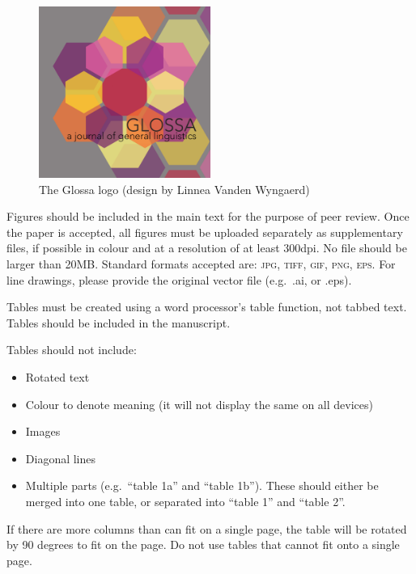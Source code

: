 \documentclass[]{glossa}
\begin{document}
\begin{figure}

{\centering \includegraphics[width=0.5\textwidth]{glossa} 

}

\caption{The Glossa logo (design by Linnea Vanden Wyngaerd)}\label{fig:fig-glossa}
\end{figure}

Figures should be included in the main text for the purpose of peer
review. Once the paper is accepted, all figures must be uploaded
separately as supplementary files, if possible in colour and at a
resolution of at least 300dpi. No file should be larger than 20MB.
Standard formats accepted are: \textsc{jpg, tiff, gif, png, eps}. For
line drawings, please provide the original vector file (e.g.~.ai, or
.eps).

Tables must be created using a word processor's table function, not
tabbed text. Tables should be included in the manuscript.

Tables should not include:

\begin{itemize}
\item
  Rotated text
\item
  Colour to denote meaning (it will not display the same on all devices)
\item
  Images
\item
  Diagonal lines
\item
  Multiple parts (e.g.~``table 1a'' and ``table 1b''). These should
  either be merged into one table, or separated into ``table 1'' and
  ``table 2''.
\end{itemize}

If there are more columns than can fit on a single page, the table will
be rotated by 90 degrees to fit on the page. Do not use tables that
cannot fit onto a single page.
\end{document}
